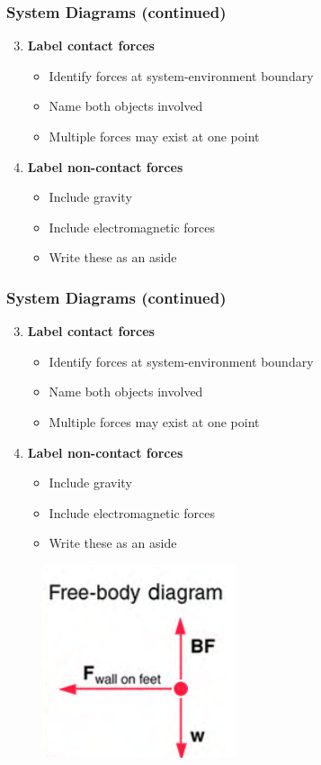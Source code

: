 \documentclass{beamer}
\begin{document}
\begin{frame}
\frametitle{System Diagrams (continued)}
\begin{enumerate}\setcounter{enumi}{2}
    \item \textbf{Label contact forces}
    \begin{itemize}
        \item Identify forces at system-environment boundary
        \item Name both objects involved
        \item Multiple forces may exist at one point
    \end{itemize}
    \item \textbf{Label non-contact forces}
    \begin{itemize}
        \item Include gravity
        \item Include electromagnetic forces
        \item Write these as an aside
    \end{itemize}
\end{enumerate}

\end{frame}

\begin{frame}
\frametitle{System Diagrams (continued)}
\begin{enumerate}\setcounter{enumi}{2}
    \item \textbf{Label contact forces}
    \begin{itemize}
        \item Identify forces at system-environment boundary
        \item Name both objects involved
        \item Multiple forces may exist at one point
    \end{itemize}
    \item \textbf{Label non-contact forces}
    \begin{itemize}
        \item Include gravity
        \item Include electromagnetic forces
        \item Write these as an aside
    \end{itemize}
\end{enumerate}
\begin{figure}[H]
    \centering
    \includegraphics[width=0.3\linewidth]{CH4/Screenshot 2024-11-07 105554.png}
\end{figure}
\end{frame}
\end{document}
